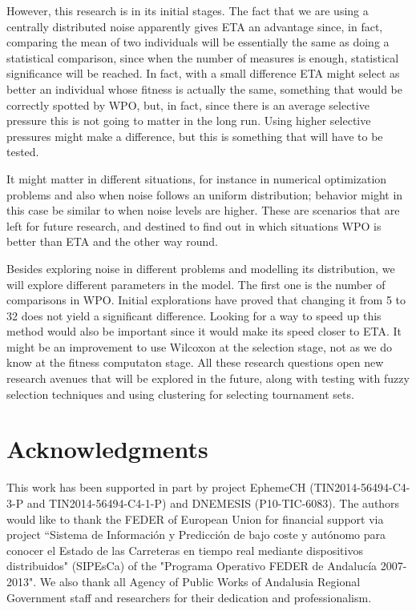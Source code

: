 \documentclass{llncs}
\begin{document}
However, this research is in its initial stages. 
The fact that we are
using a centrally distributed noise apparently gives ETA an advantage since, in
fact, comparing the mean of two individuals will be essentially the
same as doing a statistical comparison, since when the number of
measures is enough, statistical significance will be reached. In fact,
with a small difference ETA might select as better an individual whose
fitness is actually the same, something that would be correctly
spotted by WPO, but, in fact, since there is an average selective
pressure this is not going to matter in the long run. Using higher
selective pressures might make a difference, but this is something
that will have to be tested. 

It might matter in different situations, for instance in numerical
optimization problems and also when noise follows an uniform
distribution; behavior might in this case be similar to when noise
levels are higher. These are scenarios that are left for future
research, and destined to find out in which situations WPO is better
than ETA and the other way round. 

Besides exploring noise in different problems and modelling its
distribution, we will explore different parameters in the model. The first one is the number of comparisons in WPO. Initial
explorations have proved that changing it from 5 to 32 does not yield
a significant difference. Looking for a way to speed up this method
would also be important since it would make its speed closer to
ETA. It might be an improvement to use Wilcoxon at the selection
stage, not as we do know at the fitness computaton stage. All these
research questions open new research avenues that will be explored in
the future, along with testing with fuzzy selection techniques and
using clustering for selecting tournament sets. 


\section*{Acknowledgments} %

This work has been supported in part by project EphemeCH
(TIN2014-56494-C4-3-P and TIN2014-56494-C4-1-P) and DNEMESIS (P10-TIC-6083).
The authors would like to thank the FEDER of European Union for
financial support via project ``Sistema de Informaci\'on y Predicci\'on de
bajo coste y aut\'onomo para conocer el Estado de las Carreteras en
tiempo real mediante dispositivos distribuidos" (SIPEsCa) of the
"Programa Operativo FEDER de Andaluc\'ia 2007-2013". We also thank all
Agency of Public Works of Andalusia Regional Government staff and
researchers for their dedication and professionalism.
\end{document}
